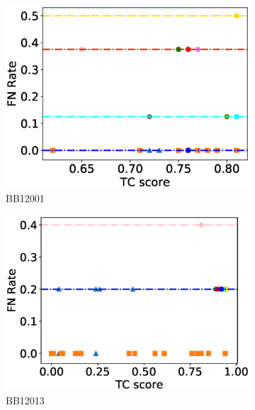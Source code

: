 \begin{figure}[!htbp]
	\centering
	\begin{adjustwidth}{-1cm}{-1cm}
		\begin{subfigure}{0.22\textwidth}
			\includegraphics[width=\columnwidth]{Figure/summary/precomputedInit/Balibase/BB12001_fnrate_vs_tc_2}
			\caption{BB12001}
		\end{subfigure}	
		\begin{subfigure}{0.22\textwidth}
			\includegraphics[width=\columnwidth]{Figure/summary/precomputedInit/Balibase/BB12013_fnrate_vs_tc_2}
			\caption{BB12013}
		\end{subfigure}
		\begin{subfigure}{0.22\textwidth}

\end{subfigure}
\end{adjustwidth}
\end{figure}
